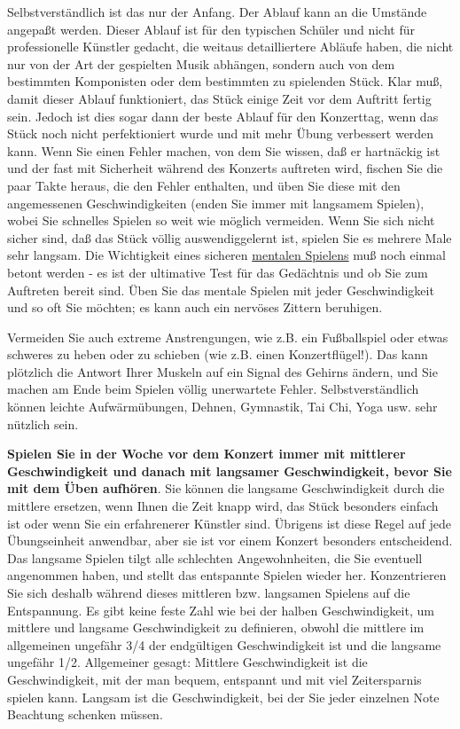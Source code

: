 Selbstverständlich ist das nur der Anfang.
Der Ablauf kann an die Umstände angepaßt werden.
Dieser Ablauf ist für den typischen Schüler und nicht für professionelle Künstler gedacht, die weitaus detailliertere Abläufe haben, die nicht nur von der Art der gespielten Musik abhängen, sondern auch von dem bestimmten Komponisten oder dem bestimmten zu spielenden Stück.
Klar muß, damit dieser Ablauf funktioniert, das Stück einige Zeit vor dem Auftritt fertig sein.
Jedoch ist dies sogar dann der beste Ablauf für den Konzerttag, wenn das Stück noch nicht perfektioniert wurde und mit mehr Übung verbessert werden kann.
Wenn Sie einen Fehler machen, von dem Sie wissen, daß er hartnäckig ist und der fast mit Sicherheit während des Konzerts auftreten wird, fischen Sie die paar Takte heraus, die den Fehler enthalten, und üben Sie diese mit den angemessenen Geschwindigkeiten (enden Sie immer mit langsamem Spielen), wobei Sie schnelles Spielen so weit wie möglich vermeiden.
Wenn Sie sich nicht sicher sind, daß das Stück völlig auswendiggelernt ist, spielen Sie es mehrere Male sehr langsam.
Die Wichtigkeit eines sicheren \hyperref[c1ii12mental]{mentalen Spielens} muß noch einmal betont werden - es ist der ultimative Test für das Gedächtnis und ob Sie zum Auftreten bereit sind.
Üben Sie das mentale Spielen mit jeder Geschwindigkeit und so oft Sie möchten; es kann auch ein nervöses Zittern beruhigen.

Vermeiden Sie auch extreme Anstrengungen, wie z.B. ein Fußballspiel oder etwas schweres zu heben oder zu schieben (wie z.B. einen Konzertflügel!).
Das kann plötzlich die Antwort Ihrer Muskeln auf ein Signal des Gehirns ändern, und Sie machen am Ende beim Spielen völlig unerwartete Fehler.
Selbstverständlich können leichte Aufwärmübungen, Dehnen, Gymnastik, Tai Chi, Yoga usw. sehr nützlich sein.

\textbf{Spielen Sie in der Woche vor dem Konzert immer mit mittlerer Geschwindigkeit und danach mit langsamer Geschwindigkeit, bevor Sie mit dem Üben aufhören}.
Sie können die langsame Geschwindigkeit durch die mittlere ersetzen, wenn Ihnen die Zeit knapp wird, das Stück besonders einfach ist oder wenn Sie ein erfahrenerer Künstler sind.
Übrigens ist diese Regel auf jede Übungseinheit anwendbar, aber sie ist vor einem Konzert besonders entscheidend.
Das langsame Spielen tilgt alle schlechten Angewohnheiten, die Sie eventuell angenommen haben, und stellt das entspannte Spielen wieder her.
Konzentrieren Sie sich deshalb während dieses mittleren bzw. langsamen Spielens auf die Entspannung.
Es gibt keine feste Zahl wie bei der halben Geschwindigkeit, um mittlere und langsame Geschwindigkeit zu definieren, obwohl die mittlere im allgemeinen ungefähr 3/4 der endgültigen Geschwindigkeit ist und die langsame ungefähr 1/2.
Allgemeiner gesagt: Mittlere Geschwindigkeit ist die Geschwindigkeit, mit der man bequem, entspannt und mit viel Zeitersparnis spielen kann.
Langsam ist die Geschwindigkeit, bei der Sie jeder einzelnen Note Beachtung schenken müssen.

